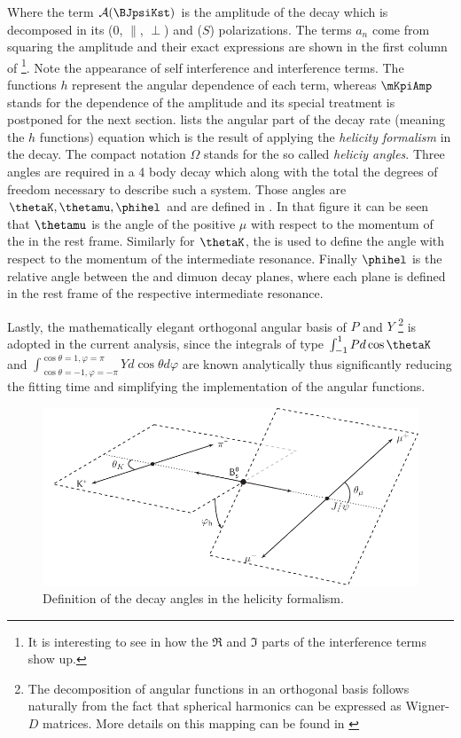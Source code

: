 \noindent Where the term $\mathcal{A}(\text{\BJpsiKst})$ is the amplitude of the decay which is decomposed in its \pwave ($0$, $\parallel$, $\perp$) and \swave ($S$) polarizations.
The terms $a_n$ come from squaring the amplitude and their exact expressions are shown in the first column of 
\footnote{It is interesting to see in \cite{jeroenThesis} how the $\Re$ and $\Im$ parts of the interference terms show up.}. 
Note the appearance of \pwave self interference and \spwave interference terms. The functions $h$ represent the angular dependence of each term, whereas $\mKpiAmp$ stands 
for the \mkpi dependence of the amplitude and its special treatment is postponed for the next section.  lists the angular part of the decay rate 
(meaning the $h$ functions) equation which is the result of applying the \emph{helicity formalism} in the \BJpsiKst decay. The compact
notation $\Omega$ stands for the so called \emph{heliciy angles}. Three angles are required in a 4 body decay which along with the \mkpi
total the degrees of freedom necessary to describe such a system. Those angles are $\thetaK,\thetamu,\phihel$ and are defined in . 
In that figure it can be seen that $\thetamu$ is the angle of the positive $\mu$ with respect to the momentum of the \Jpsi in the \Bs rest frame.
Similarly for $\thetaK$, the \kaon is used to define the angle with respect to the momentum of the intermediate \Kpi resonance. Finally $\phihel$ is 
the relative angle between the \Kpi and dimuon decay planes, where each plane is defined in the rest frame of the respective intermediate resonance.  

Lastly, the mathematically elegant orthogonal angular basis of $P$ and $Y$
\footnote{The decomposition of angular functions in an orthogonal basis follows naturally from the fact that spherical harmonics can be expressed as 
Wigner-$D$ matrices. More details on this mapping can be found in \cite{jeroenThesis} } 
is adopted in the current analysis, since the integrals of type $\int_{-1}^{1}Pd\cos\thetaK$ and $\int_{\cos\theta=-1,\varphi=-\pi}^{\cos\theta=1,\varphi=\pi}Yd\cos\theta d\varphi$ are known 
analytically thus significantly reducing the fitting time and simplifying the implementation of the angular functions.


\begin{figure}[h]
\begin{center}
  \includegraphics[width=\textwidth]{Figures/Chapter4/helAngles.pdf}
  \caption{Definition of the decay angles in the helicity formalism.}
  \label{helAngles}  
\end{center}
\end{figure}


